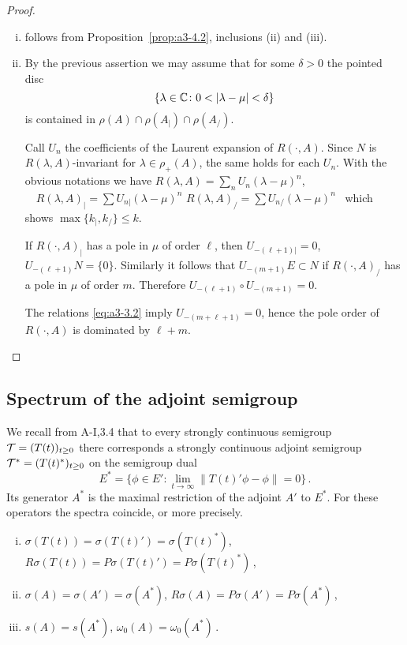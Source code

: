 \begin{proof}
\begin{enumerate}[(i), wide]
\item 
follows from Proposition~\ref{prop:a3-4.2}, inclusions (ii) and (iii).

\item 
By the previous assertion we may assume that for some $\delta > 0$ the pointed disc
\[
\{\lambda \in \mathbb{C} \colon 0 < |\lambda-\mu| < \delta\}
\]
is contained in $\rho(A) \cap \rho(A_{|}) \cap \rho(A_{/})$.

Call $U_{n}$ the coefficients of the Laurent expansion of $R(\cdot,A)$.
Since $N$ is $R(\lambda,A)$-invariant for $\lambda \in \rho_{+}(A)$, the same holds for each $U_{n}$.
With the obvious notations we have \quad
$R(\lambda,A) = \sum_{n} U_{n}(\lambda-\mu)^{n}$, $\quad R(\lambda,A)_{|} = \sum U_{n|}(\lambda-\mu)^{n}$ \quad {} \quad $R(\lambda,A)_{/} = \sum U_{n/}(\lambda-\mu)^{n}$~
which shows $\max\{k_{|},k_{/}\} \leq k$.

If $R(\cdot,A)_{|}$ has a pole in $\mu$ of order $\ell$, then $U_{-(\ell+1)|} = 0$, \ie $U_{-(\ell+1)}N = \{0\}$.
Similarly it follows that $U_{-(m+1)}E \subset N$ if $R(\cdot,A)_{/}$ has a pole in $\mu$ of order $m$.
Therefore $U_{-(\ell+1)} \circ U_{-(m+1)} = 0$.

The relations \eqref{eq:a3-3.2} imply $U_{-(m+\ell+1)} = 0$, hence the pole order of $R(\cdot,A)$ is dominated by $\ell + m$.
\end{enumerate}
\end{proof}

\subsection{Spectrum of the adjoint semigroup}\label{subsec:a3-4.4}
We recall from A-I,3.4 that to every strongly continuous semigroup $\mathcal{T} = (T(t))_{t \geq 0}$ there corresponds a strongly continuous adjoint semigroup $\mathcal{T}^* = (T(t)^*)_{t \geq 0}$ on the semigroup dual
\[
E^* = \{\phi \in E' \colon \lim_{t \to \infty} \|T(t)'\phi-\phi\| = 0\}\,.
\]
Its generator $A^*$ is the maximal restriction of the adjoint $A'$ to $E^*$.
For these operators the spectra coincide, or more precisely.
\begin{enumerate}[(i)]
\item 
$\sigma(T(t)) = \sigma(T(t)') = \sigma(T(t)^*)$,\\
$R\sigma(T(t)) = P\sigma(T(t)') = P\sigma(T(t)^*)$\,,

\item 
$\sigma(A) = \sigma(A') = \sigma(A^*)$, $R\sigma(A) = P\sigma(A') = P\sigma(A^*)$\,,
\item 
$s(A) = s(A^*)$, $\omega_{0}(A) = \omega_{0}(A^*)$\,.
\end{enumerate}

